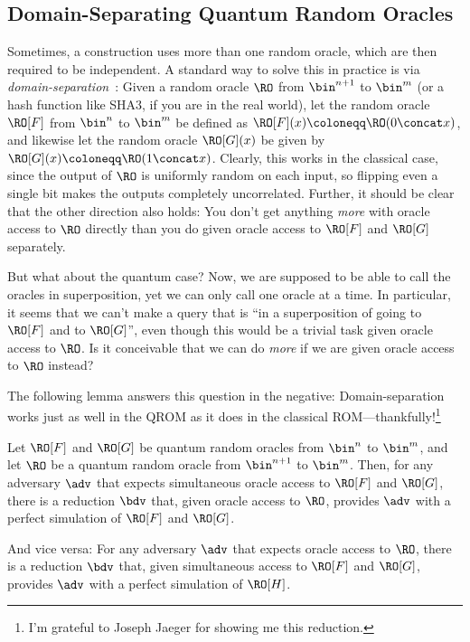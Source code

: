   \subsection{Domain-Separating Quantum Random Oracles}
    Sometimes, a construction uses more than one random oracle, which are
      then required to be independent. A standard way to solve this in practice
      is via \emph{domain-separation}~\cite{EC:BelDavGun20}: Given a random
      oracle $\RO$ from $\bin^{n+1}$ to $\bin^m$ (or a hash function like SHA3,
      if you are in the real world), let the random oracle $\RO[F]$ from
      $\bin^n$ to $\bin^m$ be defined as $\RO[F](x) \coloneqq \RO(0 \concat
      x)$, and likewise let the random oracle $\RO[G](x)$ be given by 
      $\RO[G](x) \coloneqq \RO(1 \concat x)$. Clearly, this works in the
      classical case, since the output of $\RO$ is uniformly random on each
      input, so flipping even a single bit makes the outputs completely
      uncorrelated. Further, it should be clear that the other direction also
      holds: You don't get anything \emph{more} with oracle access to
      $\RO$ directly than you do given oracle access to $\RO[F]$ and $\RO[G]$
      separately.

    But what about the quantum case? Now, we are supposed to be able to call
      the oracles in superposition, yet we can only call one oracle at a time.
      In particular, it seems that we can't make a query that is ``in a
      superposition of going to $\RO[F]$ and to $\RO[G]$'', even though this
      would be a trivial task given oracle access to $\RO$. Is it conceivable
      that we can do \emph{more} if we are given oracle access to $\RO$ instead?

    The following lemma answers this question in the negative: Domain-separation works
      just as well in the QROM as it does in the classical
      ROM---thankfully!\footnote{
        I'm grateful to Joseph Jaeger for showing me this reduction.
      }

    \begin{lemma}\label{lemma:two-equals-one}
    Let $\RO[F]$ and $\RO[G]$ be quantum random oracles from $\bin^n$ to $\bin^m$,
      and let $\RO$ be a quantum random oracle from $\bin^{n+1}$ to $\bin^m$.
      Then, for any adversary $\adv$ that expects simultaneous oracle access to 
        $\RO[F]$ and $\RO[G]$, there is a reduction $\bdv$ that, given oracle
        access to $\RO$, provides $\adv$ with a perfect simulation of $\RO[F]$
        and $\RO[G]$.

      And vice versa: For any adversary $\adv$ that expects oracle access
        to $\RO$, there is a reduction $\bdv$ that, given simultaneous access
        to $\RO[F]$ and $\RO[G]$, provides $\adv$ with a perfect simulation of $\RO[H]$.
    \end{lemma}

